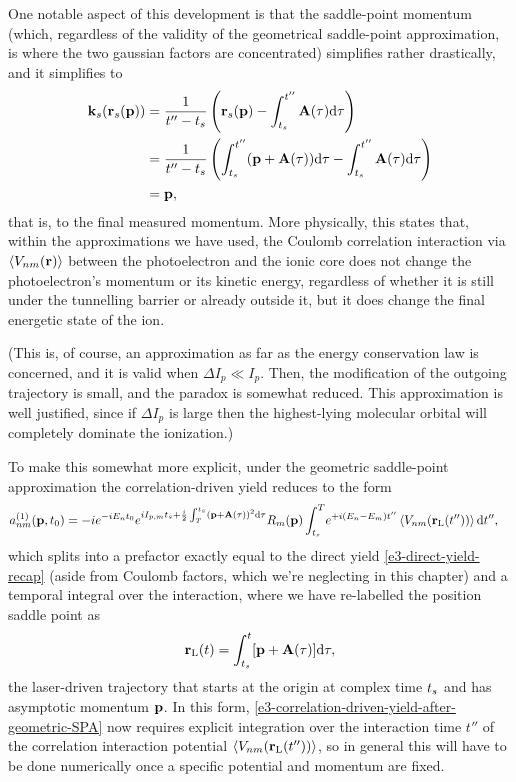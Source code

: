 One notable aspect of this development is that the saddle-point momentum (which, regardless of the validity of the geometrical saddle-point approximation, is where the two gaussian factors are concentrated) simplifies rather drastically, and it simplifies to
\begin{align}
\vb{k}_s(\vb{r}_s(\vb{p})) 
& = 
\frac{1}{t''-{t_s}} \left(  \vb{r}_s(\vb{p})-\int_{{t_s}}^{t''}\vb{A}(\tau)\mathrm{d}\tau \right)
\nonumber \\ & = 
\frac{1}{t''-{t_s}} \left(  \int_{{t_s}}^{t''} (\vb{p}+\vb{A}(\tau))\mathrm{d}\tau - \int_{{t_s}}^{t''}\vb{A}(\tau)\mathrm{d}\tau  \right)
\nonumber \\ & = 
\vb{p}
,
\end{align}
that is, to the final measured momentum. More physically, this states that, within the approximations we have used, the Coulomb correlation interaction via $\left\langle V_{nm}\mathopen{}\left( \vb{r} \right)\mathclose{} \right\rangle$ between the photoelectron and the ionic core does not change the photoelectron's momentum or its kinetic energy, regardless of whether it is still under the tunnelling barrier or already outside it, but it does change the final energetic state of the ion.

(This is, of course, an approximation as far as the energy conservation law is concerned, and it is valid when $\Delta I_p\ll I_p$. Then, the modification of the outgoing trajectory is small, and the paradox is somewhat reduced. This approximation is well justified, since if $\Delta I_p$ is large then the highest-lying molecular orbital will completely dominate the ionization.)

To make this somewhat more explicit, under the geometric saddle-point approximation the correlation-driven yield reduces to the form
\begin{align}
a_{nm}^{(1)}(\vb{p},{t_0})
& =
-i
e^{-iE_n {t_0}}
e^{iI_{p,m} {t_s}+\frac{i}{2} \int_T^{{t_s}}\left(\vb{p}+\vb{A}(\tau)\right)^2\mathrm{d}\tau} 
R_m(\vb{p})
\int_{{t_s}}^T\!
e^{+i(E_n-E_m)t''}
\left\langle V_{nm}\mathopen{}\left( \vb{r}_\mathrm{L}(t'') \right)\mathclose{} \right\rangle
\mathrm{d} t''
,
\label{e3-correlation-driven-yield-after-geometric-SPA}
\end{align}
which splits into a prefactor exactly equal to the direct yield \eqref{e3-direct-yield-recap} (aside from Coulomb factors, which we're neglecting in this chapter) and a temporal integral over the interaction, where we have re-labelled the position saddle point as
\begin{equation}
\vb{r}_\mathrm{L}(t) = \int_{{t_s}}^{t} [\vb{p}+\vb{A}(\tau)]\mathrm{d}\tau,
\label{e3-laser-driven-trajectory}
\end{equation}
the laser-driven trajectory that starts at the origin at complex time ${t_s}$ and has asymptotic momentum $\vb{p}$. In this form, \eqref{e3-correlation-driven-yield-after-geometric-SPA} now requires explicit integration over the interaction time $t''$ of the correlation interaction potential $\left\langle V_{nm}\mathopen{}\left( \vb{r}_\mathrm{L}(t'') \right)\mathclose{} \right\rangle$, so in general this will have to be done numerically once a specific potential and momentum are fixed.



